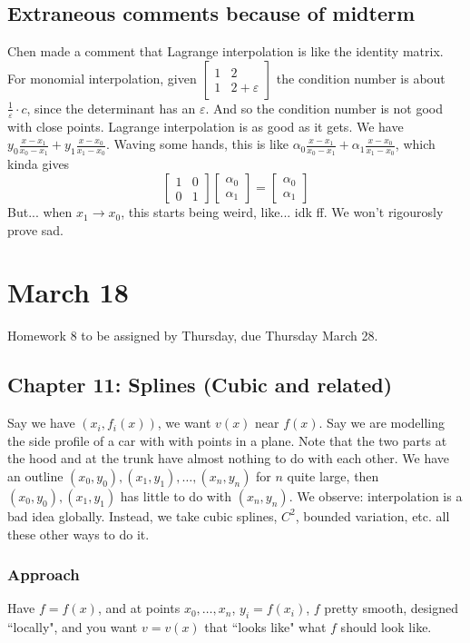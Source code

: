 \documentclass{article}
\theoremstyle{plain}
\theoremstyle{remark}
\newcommand{\ep}{{\varepsilon}}
\begin{document}
\subsection{Extraneous comments because of midterm}
Chen made a comment that Lagrange interpolation is like the identity matrix.
For monomial interpolation, given $\begin{bmatrix} 1 & 2 \\ 1 & 2 + \ep \end{bmatrix}$
the condition number is about $\frac{1}{\ep}\cdot c$,
since the determinant has an $\ep$.
And so the condition number is not good with close points.
Lagrange interpolation is as good as it gets.
We have $y_0\frac{x-x_1}{x_0-x_1} + y_1 \frac{x-x_0}{x_1-x_0}$.
Waving some hands, this is like
$\alpha_0\frac{x-x_1}{x_0-x_1} + \alpha_1 \frac{x-x_0}{x_1-x_0}$,
which kinda gives
\[
	\begin{bmatrix} 1 & 0 \\ 0 & 1 \end{bmatrix}
	\begin{bmatrix} \alpha_0 \\ \alpha_1 \end{bmatrix}
	= \begin{bmatrix} \alpha_0 \\ \alpha_1 \end{bmatrix}
\]
But... when $x_1 \to x_0$, this starts being weird, like... idk ff.
We won't rigourosly prove sad.


\section{March 18}
Homework $8$ to be assigned by Thursday, due Thursday March 28.

\subsection{Chapter 11: Splines (Cubic and related)}
Say we have $(x_i,f_i(x))$, we want $v(x)$ near $f(x)$.
Say we are modelling the side profile of a car with with points in a plane.
Note that the two parts at the hood and at the trunk have almost nothing to do with each other.
We have an outline $(x_0,y_0),(x_1,y_1),\dots,(x_n,y_n)$ for $n$ quite large,
then $(x_0,y_0),(x_1,y_1)$ has little to do with $(x_n,y_n)$.
We observe: interpolation is a bad idea globally.
Instead, we take cubic splines, $C^2$, bounded variation, etc.
all these other ways to do it.

\subsubsection{Approach}
Have $f = f(x)$, and at points $x_0,\dots,x_n$,
$y_i = f(x_i)$, $f$ pretty smooth,
designed ``locally", and you want $v = v(x)$ that ``looks like" what
$f$ should look like.
\end{document}
